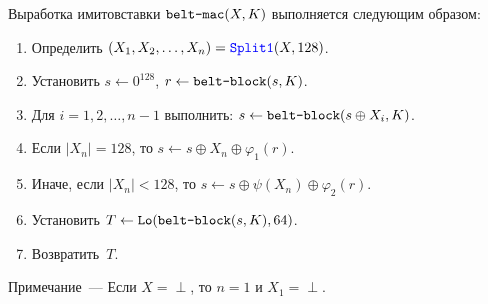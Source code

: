 Выработка имитовставки $\texttt{belt-mac}(X,K)$ выполняется следующим образом:
\begin{enumerate}
\item
Определить $(X_1,X_2,\ldots,X_n)=\mathop{\textcolor{blue}{\texttt{Split1}}}\nolimits(X,128)$.
\item
Установить
$s\leftarrow 0^{128}$, $r\leftarrow \texttt{belt-block}(s,K)$.
\item
Для $i=1,2,\ldots,n-1$ выполнить:
$s\leftarrow \texttt{belt-block}(s\oplus X_i,K)$.
\item
Если $|X_n|=128$, то 
$s\leftarrow s\oplus X_n\oplus \varphi_1(r)$.
\item
Иначе, если $|X_n|<128$, то
$s\leftarrow s\oplus\psi(X_n)\oplus\varphi_2(r)$.
\item
Установить
$T\leftarrow\mathop{\texttt{Lo}}\nolimits(\texttt{belt-block}(s,K), 64)$.
\item
Возвратить~$T$.
\end{enumerate}

\vskip9pt
\begin{note}
Примечание~--- Если $X=\perp$, то $n=1$ и $X_1=\perp$.
\end{note}
